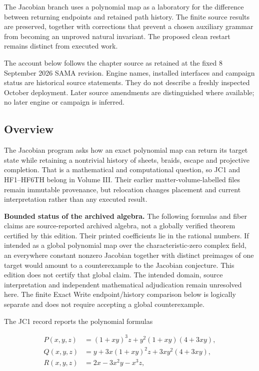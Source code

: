 \label{viii-ch11-jacobian-maps-return-and-retained-history}

The Jacobian branch uses a polynomial map as a laboratory for the
difference between returning endpoints and retained path history. The
finite source results are preserved, together with corrections that
prevent a chosen auxiliary grammar from becoming an unproved natural
invariant. The proposed clean restart remains distinct from executed
work.

The account below follows the chapter source as retained at the fixed 8
September 2026 SAMA revision. Engine names, installed interfaces and
campaign status are historical source statements. They do not describe a
freshly inspected October deployment. Later source amendments are
distinguished where available; no later engine or campaign is inferred.

\subsection{Overview}\label{viii-ch11-overview}

The Jacobian program asks how an exact polynomial map can return its
target state while retaining a nontrivial history of sheets, braids,
escape and projective completion. That is a mathematical and
computational question, so JC1 and HF1--HF6TH belong in Volume III.
Their earlier matter-volume-labelled files remain immutable provenance,
but relocation changes placement and current interpretation rather than
any executed result.

\textbf{Bounded status of the archived algebra.} The following formulas
and fiber claims are source-reported archived algebra, not a globally
verified theorem certified by this edition. Their printed coefficients
lie in the rational numbers. If intended as a global polynomial map over
the characteristic-zero complex field, an everywhere constant nonzero
Jacobian together with distinct preimages of one target would amount to
a counterexample to the Jacobian conjecture. This edition does not
certify that global claim. The intended domain, source interpretation
and independent mathematical adjudication remain unresolved here. The
finite Exact Write endpoint/history comparison below is logically
separate and does not require accepting a global counterexample.

The JC1 record reports the polynomial formulas

\[
\begin{aligned}
P(x,y,z)&=(1+xy)^3z+y^2(1+xy)(4+3xy),\\
Q(x,y,z)&=y+3x(1+xy)^2z+3xy^2(4+3xy),\\
R(x,y,z)&=2x-3x^2y-x^3z,
\end{aligned}
\]

